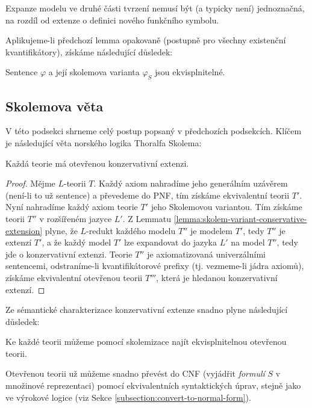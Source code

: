\begin{remark}
    Expanze modelu ve druhé části tvrzení nemusí být (a typicky není) jednoznačná, na rozdíl od extenze o definici nového funkčního symbolu.
\end{remark}

Aplikujeme-li předchozí lemma opakovaně (postupně pro všechny existenční kvantifikátory), získáme následující důsledek:

\begin{corollary}
    Sentence $\varphi$ a její skolemova varianta $\varphi_S$ jsou ekvisplnitelné.
\end{corollary}


\subsection{Skolemova věta}

V této podsekci shrneme celý postup popsaný v předchozích podsekcích. Klíčem je následující věta norského logika Thoralfa Skolema:

\begin{theorem}
    Každá teorie má otevřenou konzervativní extenzi.
\end{theorem}
\begin{proof}
    Mějme $L$-teorii $T$. Každý axiom nahradíme jeho generálním uzávěrem (není-li to už sentence) a převedeme do PNF, tím získáme ekvivalentní teorii $T'$. Nyní nahradíme každý axiom teorie $T'$ jeho Skolemovou variantou. Tím získáme teorii $T''$ v rozšířeném jazyce $L'$. Z Lemmatu \ref{lemma:skolem-variant-conservative-extension} plyne, že $L$-redukt každého modelu $T''$ je modelem $T'$, tedy $T''$ je extenzí $T'$, a že každý model $T'$ lze expandovat do jazyka $L'$ na model $T''$, tedy jde o konzervativní extenzi. Teorie $T''$ je axiomatizovaná univerzálními sentencemi, odstraníme-li kvantifikátorové prefixy (tj. vezmeme-li jádra axiomů), získáme ekvivalentní otevřenou teorii $T'''$, která je hledanou konzervativní extenzí.
\end{proof}

Ze sémantické charakterizace konzervativní extenze snadno plyne následující důsledek:

\begin{corollary}
    Ke každé teorii můžeme pomocí skolemizace najít ekvisplnitelnou otevřenou teorii.
\end{corollary}

Otevřenou teorii už můžeme snadno převést do CNF (vyjádřit \emph{formulí} $S$ v množinové reprezentaci) pomocí ekvivalentních syntaktických úprav, stejně jako ve výrokové logice (viz Sekce \ref{subsection:convert-to-normal-form}).


